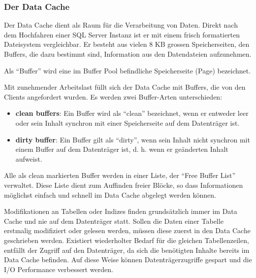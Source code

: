         \subsubsection{Der Data Cache}
          Der Data Cache dient als Raum für die Verarbeitung von Daten.
          Direkt nach dem Hochfahren einer SQL Server Instanz ist er mit
          einem frisch formatierten Dateisystem vergleichbar. Er besteht aus
          vielen 8 KB grossen Speicherseiten, den Buffers, die dazu bestimmt sind,
          Information aus den Datendateien aufzunehmen. 
          \begin{merke}
            Als \enquote{Buffer} wird eine im Buffer Pool befindliche
            Speicherseite (Page) bezeichnet.
          \end{merke}
          Mit zunehmender Arbeitslast füllt sich der Data Cache mit Buffers, die
          von den Clients angefordert wurden. Es werden zwei Buffer-Arten
          unterschieden:
          \begin{itemize}
              \item \textbf{clean buffers}: Ein Buffer wird als \enquote{clean}
              bezeichnet, wenn er entweder leer oder sein Inhalt synchron
              mit einer Speicherseite auf dem Datenträger ist.
              \item \textbf{dirty buffer}: Ein Buffer gilt als \enquote{dirty},
              wenn sein Inhalt nicht synchron mit einem Buffer auf dem
              Datenträger ist, d. h. wenn er geänderten Inhalt aufweist.
          \end{itemize}
          Alle als clean markierten Buffer werden in einer Liste, der
          \enquote{Free Buffer List} verwaltet. Diese Liste dient zum Auffinden
          freier Blöcke, so dass Informationen möglichst einfach und schnell im
          Data Cache abgelegt werden können.
          
          Modifikationen an Tabellen oder Indizes finden grundsätzlich immer
          im Data Cache und nie auf dem Datenträger statt. Sollen die Daten
          einer Tabelle erstmalig modifiziert oder gelesen werden, müssen
          diese zuerst in den Data Cache geschrieben werden. Existiert
          wiederholter Bedarf für die gleichen Tabellenzeilen, entfällt der
          Zugriff auf den Datenträger, da sich die benötigten Inhalte
          bereits im Data Cache befinden. Auf diese Weise können
          Datenträgerzugriffe gespart und die I/O Performance verbessert
          werden.


